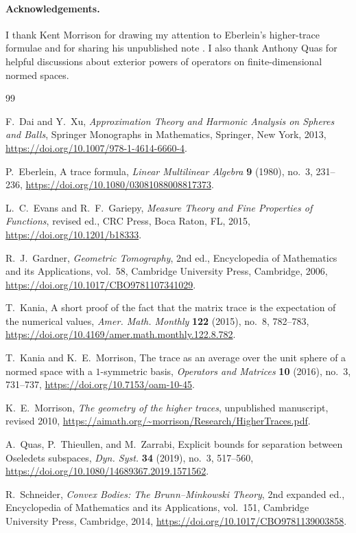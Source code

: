 \documentclass[11pt,a4paper]{amsart}
\numberwithin{equation}{section}
\theoremstyle{plain}
\theoremstyle{definition}
\theoremstyle{remark}
\begin{document}
\paragraph*{Acknowledgements.}
I thank Kent Morrison for drawing my attention to Eberlein's higher-trace formulae and for sharing his unpublished note \cite{MorrisonHigher}. I also thank Anthony Quas for helpful discussions about exterior powers of operators on finite-dimensional normed spaces.

\begin{thebibliography}{99}

F.~Dai and Y.~Xu,
\emph{Approximation Theory and Harmonic Analysis on Spheres and Balls},
Springer Monographs in Mathematics, Springer, New York, 2013,
\url{https://doi.org/10.1007/978-1-4614-6660-4}.

P.~Eberlein,
A trace formula,
\emph{Linear Multilinear Algebra} \textbf{9} (1980), no.~3, 231--236,
\url{https://doi.org/10.1080/03081088008817373}.

L.~C.~Evans and R.~F.~Gariepy,
\emph{Measure Theory and Fine Properties of Functions},
revised ed., CRC Press, Boca Raton, FL, 2015,
\url{https://doi.org/10.1201/b18333}.

R.~J.~Gardner,
\emph{Geometric Tomography},
2nd ed., Encyclopedia of Mathematics and its Applications, vol.~58,
Cambridge University Press, Cambridge, 2006,
\url{https://doi.org/10.1017/CBO9781107341029}.

T.~Kania,
A short proof of the fact that the matrix trace is the expectation of the numerical values,
\emph{Amer. Math. Monthly} \textbf{122} (2015), no.~8, 782--783,
\url{https://doi.org/10.4169/amer.math.monthly.122.8.782}.

T.~Kania and K.~E.~Morrison,
The trace as an average over the unit sphere of a normed space with a $1$-symmetric basis,
\emph{Operators and Matrices} \textbf{10} (2016), no.~3, 731--737,
\url{https://doi.org/10.7153/oam-10-45}.

K.~E.~Morrison,
\emph{The geometry of the higher traces},
unpublished manuscript, revised 2010,
\url{https://aimath.org/~morrison/Research/HigherTraces.pdf}.

A.~Quas, P.~Thieullen, and M.~Zarrabi,
Explicit bounds for separation between Oseledets subspaces,
\emph{Dyn. Syst.} \textbf{34} (2019), no.~3, 517--560,
\url{https://doi.org/10.1080/14689367.2019.1571562}.

R.~Schneider,
\emph{Convex Bodies: The Brunn--Minkowski Theory},
2nd expanded ed., Encyclopedia of Mathematics and its Applications, vol.~151,
Cambridge University Press, Cambridge, 2014,
\url{https://doi.org/10.1017/CBO9781139003858}.

\end{thebibliography}
\end{document}
